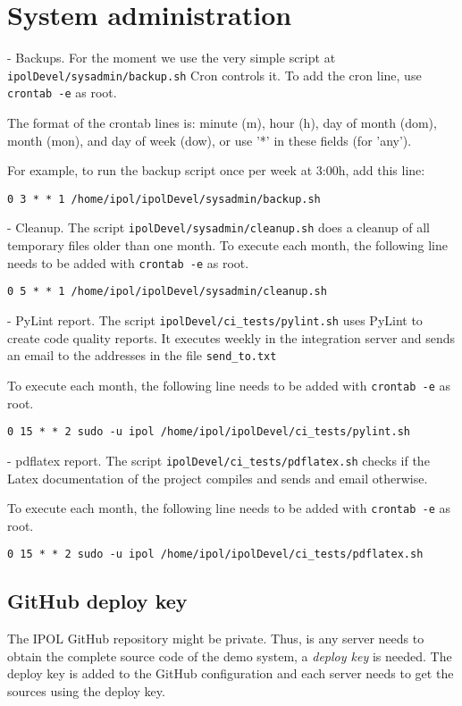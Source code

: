 \section{System administration}

- Backups. For the moment we use the very simple script at {\tt ipolDevel/sysadmin/backup.sh}
Cron controls it. To add the cron line, use {\tt crontab -e} as root.

The format of the crontab lines is: minute (m), hour (h), day of month (dom), month (mon), and day of week (dow), or use '*' in these fields (for 'any').

For example, to run the backup script once per week at 3:00h, add this line:

{\tt 0 3 * * 1 /home/ipol/ipolDevel/sysadmin/backup.sh}

- Cleanup. The script {\tt ipolDevel/sysadmin/cleanup.sh} does a cleanup of all temporary files older than one month. To execute each month, the following line needs to be added with {\tt crontab -e} as root.

{\tt 0 5 * * 1 /home/ipol/ipolDevel/sysadmin/cleanup.sh}

- PyLint report. The script {\tt ipolDevel/ci\_tests/pylint.sh} uses PyLint to create code quality reports. It executes weekly in the integration server and sends an email to the addresses in the file {\tt send\_to.txt}

To execute each month, the following line needs to be added with {\tt crontab -e} as root.

{\tt 0 15 * * 2 sudo -u ipol /home/ipol/ipolDevel/ci\_tests/pylint.sh}

- pdflatex report. The script {\tt ipolDevel/ci\_tests/pdflatex.sh} checks if the Latex documentation of the project compiles and sends and email otherwise.

To execute each month, the following line needs to be added with {\tt crontab -e} as root.

{\tt 0 15 * * 2 sudo -u ipol /home/ipol/ipolDevel/ci\_tests/pdflatex.sh}



\subsection{GitHub deploy key}
The IPOL GitHub repository might be private. Thus, is any server needs to obtain the complete source code of the demo system, a \emph{deploy key} is needed. The deploy key is added to the GitHub configuration and each server needs to get the sources using the deploy key.

